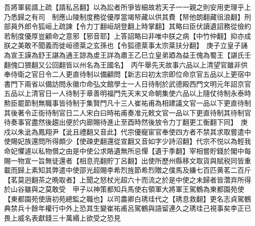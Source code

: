 吾將軍裴諝上疏【諝私呂翻】以為訟者所爭皆細故若天子一一親之則安用吏理乎上乃悉歸之有司　制應山陵制度務從優厚當竭帑藏以供其費【帑他朗翻藏徂浪翻】刑部員外郎令狐峘上疏諫【令力丁翻峘胡登翻上時掌翻】其略曰臣伏讀遺詔務從儉約若制度優厚豈顧命之意邪【邪音耶】上答詔略曰非唯中朕之病【中竹仲翻】抑亦成朕之美敢不聞義而徙峘德棻之玄孫也【令狐德棻事太宗棻扶分翻】　庚子立皇子誦為宣王謨為舒王諶為通王諒為䖍王詳為肅王乙巳立皇弟廼為益王傀為蜀王【諶氏壬翻傀口猥翻又公回翻皆以州名為王國名】　丙午舉先天故事六品以上清望官雖非供奉侍衛之官日令二人更直待制以備顧問【新志曰初太宗即位命京官五品以上更宿中書門下兩省以備訪問永徽巾命弘文館學士一人日待制於武德殿西門文明元年詔京官五品以上清官日一人待制于章善明福門先天末又命朝集使六品以上隨仗待制永泰時勲臣罷節制無職事皆待制于集賢門凡十三人崔祐甫為相建議文官一品以下更直待制其後著令正衙待制官日二人宋白曰時祐甫奏准元敕文官一品以下更直待制其待制官待奏事官盡然後趨出便於内廊賜待進止至酉時然後放令力丁翻更工衡翻下同】　庚戍以朱泚為鳳翔尹【泚且禮翻又音此】代宗優寵宦官奉使四方者不禁其求取嘗遣中使賜妃族還問所得頗少【使疎吏翻還從宣翻又音如字少詩沼翻】代宗不悦以為輕我命妃懼遽以私物償之由是中使公求賂遺無所忌憚【遺于季翻】宰相嘗貯錢於閣中每賜一物宣一旨無徒還者【相息亮翻貯丁呂翻】出使所歷州縣移文取貨與賦税同皆重載而歸上素知其弊遣中使邵光超賜李希烈旌節希烈贈之僕馬及縑七百匹黄茗二百斤【茗莫迥翻茶之晩取者】上聞之怒杖光超六十而流之於是中使之未歸者皆濳弃所得於山谷雖與之莫敢受　甲子以神策都知兵馬使右領軍大將軍王駕鶴為東都園苑使【東都園苑使唐初苑總監之職也】以司農卿白琇珪代之【琇息救翻】更名志貞駕鶴典禁兵十餘年權行中外上恐其生變崔祐甫呂駕鶴與語留連久之琇珪己視事矣李正已畏上威名表獻錢三十萬緡上欲受之恐見

